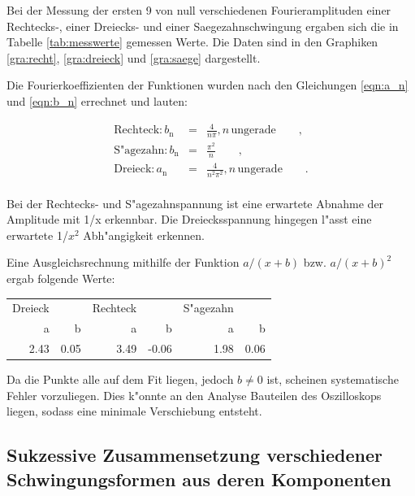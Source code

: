 \clearpage




Bei der Messung der ersten 9 von null verschiedenen Fourieramplituden einer Rechtecks-, einer Dreiecks- und einer Saegezahnschwingung ergaben sich die in Tabelle \ref{tab:messwerte} gemessen Werte. Die Daten sind in den Graphiken \ref{gra:recht}, \ref{gra:dreieck} und \ref{gra:saege} dargestellt.

Die Fourierkoeffizienten der Funktionen wurden nach den Gleichungen \eqref{eqn:a_n} und \eqref{eqn:b_n} errechnet und lauten:

\begin{eqnarray*}
\text{Rechteck}: b_\mathrm{n} &=& \frac{4}{n \pi}, n \, \text{ungerade} \qquad ,\\
\text{S"agezahn}: b_\mathrm{n} &=& \frac{\pi^2}{n}  \qquad ,\\
\text{Dreieck}: a_\mathrm{n} &=& \frac{4}{n^2 \pi^2}, n \,\text{ungerade} \qquad .\\
\end{eqnarray*}

Bei der Rechtecks- und S"agezahnspannung ist eine erwartete Abnahme der Amplitude mit 1/x erkennbar.
Die Dreiecksspannung hingegen l"asst eine erwartete 1/$x^2$ Abh"angigkeit erkennen.

Eine Ausgleichsrechnung mithilfe der Funktion $a/(x+b)$ bzw. $a/(x+b)^2$ ergab folgende Werte:

\begin{table}[!h]
\begin{center}
\begin{tabular}{|r|r|r|r|r|r|}
\hline
Dreieck & & Rechteck & & S"agezahn &\\
a & b & a & b & a & b\\
\hline
\hline
2.43 & 0.05 & 3.49 & -0.06 & 1.98 & 0.06\\
\hline
\end{tabular}
\label{}
\end{center}
\end{table}

Da die Punkte alle auf dem Fit liegen, jedoch $b \neq 0$ ist, scheinen systematische Fehler vorzuliegen. Dies k"onnte an den Analyse Bauteilen des Oszilloskops liegen, sodass eine minimale Verschiebung entsteht.

\subsection{Sukzessive Zusammensetzung verschiedener Schwingungsformen aus deren Komponenten} %
\label{sub:sukzessive_zusammensetzung_verschiedener_schwingungsformen_aus_deren_komponenten}

